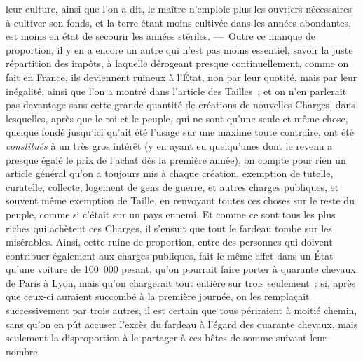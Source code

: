 \documentclass[french,twoside]{book} %
\begin{document}
leur culture, ainsi que l’on a dit, le maître n’emploie plus les ouvriers nécessaires à cultiver son fonds, et la terre étant moins cultivée dans les années abondantes, est moins en état de secourir les années stériles. — Outre ce manque de proportion, il y en a encore un autre qui n’est pas moins essentiel, savoir la juste répartition des impôts, à laquelle dérogeant presque continuellement, comme on fait en France, ils deviennent ruineux à l’État, non par leur quotité, mais par leur inégalité, ainsi que l’on a montré dans l’article des Tailles ; et on n’en parlerait pas davantage sans cette grande quantité de créations de nouvelles Charges, dans lesquelles, après que le roi et le peuple, qui ne sont qu’une seule et même chose, quelque fondé jusqu’ici qu’ait été l’usage sur une maxime toute contraire, ont été {\itshape constitués} à un très gros intérêt (y en ayant eu quelqu’unes dont le revenu a presque égalé le prix de l’achat dès la première année), on compte pour rien un article général qu’on a toujours mis à chaque création, exemption de tutelle, curatelle, collecte, logement de gens de guerre, et autres charges publiques, et souvent même exemption de Taille, en renvoyant toutes ces choses sur le reste du peuple, comme si c’était sur un pays ennemi. Et comme ce sont tous les plus riches qui achètent ces Charges, il s’ensuit que tout le fardeau tombe sur les misérables. Ainsi, cette ruine de proportion, entre des personnes qui doivent contribuer également aux charges publiques, fait le même effet dans un État qu’une voiture de 100 000 pesant, qu’on pourrait faire porter à quarante chevaux de Paris à Lyon, mais qu’on chargerait tout entière sur trois seulement : si, après que ceux-ci auraient succombé à la première journée, on les remplaçait successivement par trois autres, il est certain que tous périraient à moitié chemin, sans qu’on en pût accuser l’excès du fardeau à l’égard des quarante chevaux, mais seulement la disproportion à le partager à ces bêtes de somme suivant leur nombre.
\end{document}
